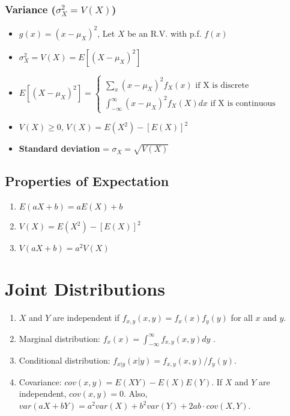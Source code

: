 \documentclass[10pt]{article}
\begin{document}
\subsubsection*{Variance ($\sigma_X^2 = V(X)$)}
\begin{itemize}
    \item $g(x) = (x - \mu^{}_{X})^2$, Let $X$ be an R.V. with p.f. $f(x)$
    \item $\sigma_X^2 = V(X) = E[(X-\mu^{}_X)^2]$
    \item $E[(X-\mu^{}_X)^2] = \begin{cases}
                  \sum_{x}^{} (x - \mu^{}_X)^2 f_X^{}(x) \text{ if X is discrete} \\
                  \int_{-\infty}^{\infty}(x-\mu_X^{})^2 f_X^{}(X) dx \text{ if X is continuous}
              \end{cases}$
    \item $V(X) \geq 0$, $V(X) = E(X^2) - [E(X)]^2$
    \item \textbf{Standard deviation} = $\sigma_X^{} = \sqrt{V(X)}$
\end{itemize}
\subsection*{Properties of Expectation}
\begin{enumerate}
    \item $E(aX+b) = aE(X) + b$
    \item $V(X) = E(X^2) - [E(X)]^2$
    \item $V(aX+b)=a^2V(X)$
\end{enumerate}

\section*{Joint Distributions}
\begin{enumerate}
    \item $X$ and $Y$ are independent if $f_{x,y}(x,y) = f_x(x)f_y(y)$ for all $x$ and $y$.
    \item Marginal distribution: $f_x(x) = \int_{-\infty}^{\infty}f_{x,y}(x,y) dy$ .
    \item Conditional distribution: $f_{x|y}(x|y) = f_{x,y}(x,y)/f_y(y)$.
    \item Covariance: $cov(x,y) = E(XY) - E(X)E(Y)$. If $X$ and $Y$ are independent, $cov(x,y) = 0$.
          Also, $var(aX + bY) = a^2var(X) + b^2var(Y) + 2ab \cdot cov(X,Y)$.
\end{enumerate}
\end{document}
